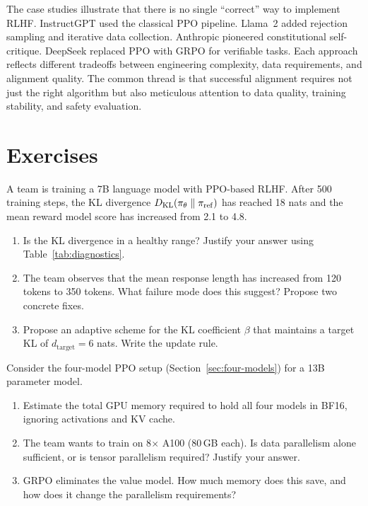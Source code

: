 The case studies illustrate that there is no single ``correct'' way to implement RLHF. InstructGPT used the classical PPO pipeline. Llama~2 added rejection sampling and iterative data collection. Anthropic pioneered constitutional self-critique. DeepSeek replaced PPO with GRPO for verifiable tasks. Each approach reflects different tradeoffs between engineering complexity, data requirements, and alignment quality. The common thread is that successful alignment requires not just the right algorithm but also meticulous attention to data quality, training stability, and safety evaluation.

\section*{Exercises}

\begin{exercise}
\label{ex:kl-budget}
A team is training a 7B language model with PPO-based RLHF. After 500 training steps, the KL divergence $D_{\mathrm{KL}}\!\left(\pi_\theta\;\|\;\pi_{\mathrm{ref}}\right)$ has reached 18 nats and the mean reward model score has increased from 2.1 to 4.8.
\begin{enumerate}
  \item Is the KL divergence in a healthy range? Justify your answer using Table~\ref{tab:diagnostics}.
  \item The team observes that the mean response length has increased from 120 tokens to 350 tokens. What failure mode does this suggest? Propose two concrete fixes.
  \item Propose an adaptive scheme for the KL coefficient $\beta$ that maintains a target KL of $d_{\mathrm{target}} = 6$ nats. Write the update rule.
\end{enumerate}
\end{exercise}

\begin{exercise}
\label{ex:four-model-memory}
Consider the four-model PPO setup (Section~\ref{sec:four-models}) for a 13B parameter model.
\begin{enumerate}
  \item Estimate the total GPU memory required to hold all four models in BF16, ignoring activations and KV cache.
  \item The team wants to train on 8$\times$ A100 (80\,GB each). Is data parallelism alone sufficient, or is tensor parallelism required? Justify your answer.
  \item GRPO eliminates the value model. How much memory does this save, and how does it change the parallelism requirements?
\end{enumerate}
\end{exercise}

